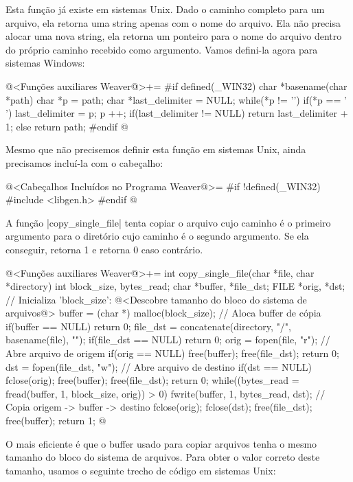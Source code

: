
Esta função já existe em sistemas Unix. Dado o caminho completo para
um arquivo, ela retorna uma string apenas com o nome do arquivo. Ela
não precisa alocar uma nova string, ela retorna um ponteiro para o
nome do arquivo dentro do próprio caminho recebido como argumento.
Vamos defini-la agora para sistemas Windows:

\iniciocodigo
@<Funções auxiliares Weaver@>+=
#if defined(_WIN32)
char *basename(char *path){
  char *p = path;
  char *last_delimiter = NULL;
  while(*p != '\0'){
    if(*p == '\\')
      last_delimiter = p;
    p ++;
  }
  if(last_delimiter != NULL)
    return last_delimiter + 1;
  else
    return path;
}
#endif
@
\fimcodigo

Mesmo que não precisemos definir esta função em sistemas Unix, ainda
precisamos incluí-la com o cabeçalho:

\iniciocodigo
@<Cabeçalhos Incluídos no Programa Weaver@>=
#if !defined(_WIN32)
#include <libgen.h>
#endif
@
\fimcodigo


A função |copy_single_file| tenta copiar o
arquivo cujo caminho é o primeiro argumento para o diretório cujo
caminho é o segundo argumento. Se ela conseguir, retorna 1 e retorna 0
caso contrário.

\iniciocodigo
@<Funções auxiliares Weaver@>+=
int copy_single_file(char *file, char *directory){
  int block_size, bytes_read;
  char *buffer, *file_dst;
  FILE *orig, *dst;
  // Inicializa 'block_size':
  @<Descobre tamanho do bloco do sistema de arquivos@>
  buffer = (char *) malloc(block_size); // Aloca buffer de cópia
  if(buffer == NULL) return 0;
  file_dst = concatenate(directory, "/", basename(file), "");
  if(file_dst == NULL) return 0;
  orig = fopen(file, "r"); // Abre arquivo de origem
  if(orig == NULL){
    free(buffer);
    free(file_dst);
    return 0;
  }
  dst = fopen(file_dst, "w"); // Abre arquivo de destino
  if(dst == NULL){
    fclose(orig);
    free(buffer);
    free(file_dst);
    return 0;
  }
  while((bytes_read = fread(buffer, 1, block_size, orig)) > 0){
    fwrite(buffer, 1, bytes_read, dst); // Copia origem -> buffer -> destino
  }
  fclose(orig);
  fclose(dst);
  free(file_dst);
  free(buffer);
  return 1;
}
@
\fimcodigo

O mais eficiente é que o buffer usado para copiar arquivos tenha o
mesmo tamanho do bloco do sistema de arquivos. Para obter o valor
correto deste tamanho, usamos o seguinte trecho de código em sistemas
Unix:

